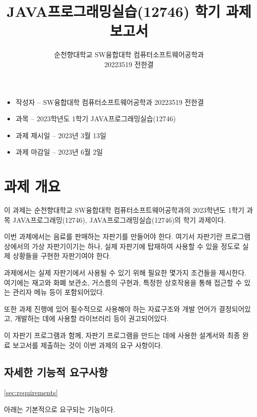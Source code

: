 \documentclass{oblivoir}
\title{JAVA프로그래밍실습(12746) 학기 과제 보고서}
\author{순천향대학교 SW융합대학 컴퓨터소프트웨어공학과\\20223519 전한결}
\begin{document}
    \maketitle

    \begin{itemize}
        \item 작성자 – SW융합대학 컴퓨터소프트웨어공학과 20223519 전한결
        \item 과목 – 2023학년도 1학기 JAVA프로그래밍실습(12746)
        \item 과제 제시일 – 2023년 3월 13일
        \item 과제 마감일 – 2023년 6월 2일
    \end{itemize}

    \pagebreak

    \tableofcontents

    \pagebreak

    \section{과제 개요}

    이 과제는 순천향대학교 SW융합대학 컴퓨터소프트웨어공학과의
    2023학년도 1학기 과목 JAVA프로그래밍(12746), JAVA프로그래밍실습(12746)의
    학기 과제이다.

    이번 과제에서는 음료를 판매하는 자판기를 만들어야 한다.
    여기서 자판기란 프로그램상에서의 가상 자판기이기는 하나,
    실제 자판기에 탑재하여 사용할 수 있을 정도로 실제 상황들을
    구현한 자판기여야 한다.

    과제에서는 실제 자판기에서 사용될 수 있기 위해 필요한 몇가지
    조건들을 제시한다.
    여기에는 재고와 화폐 보관소, 거스름의 구현과, 특정한 상호작용을 통해
    접근할 수 있는 관리자 메뉴 등이 포함되어있다.

    또한 과제 진행에 있어 필수적으로 사용해야 하는 자료구조와
    개발 언어가 결정되어있고,
    개발하는 데에 사용할 라이브러리 등이 권고되어있다.

    이 자판기 프로그램과 함께,
    자판기 프로그램을 만드는 데에 사용한 설계서와 최종 완료 보고서를
    제출하는 것이 이번 과제의 요구 사항이다.

    \subsection{자세한 기능적 요구사항}
    \ref{sec:requirements}

    아래는 기본적으로 요구되는 기능이다.
\end{document}
